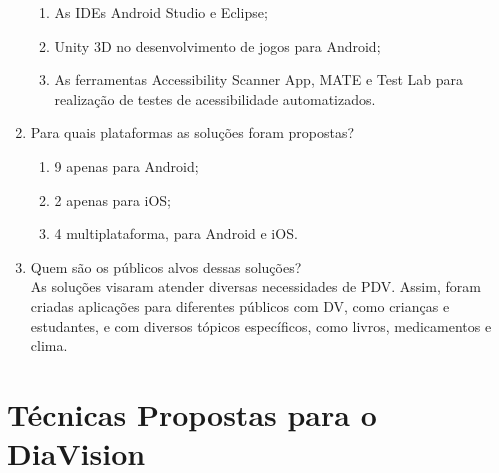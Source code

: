 \begin{enumerate}
\begin{enumerate}
                  \item As IDEs Android Studio e Eclipse;
                  \item Unity 3D no desenvolvimento de jogos para Android;
                  \item As ferramentas Accessibility Scanner App, MATE e Test Lab para realização de testes de acessibilidade automatizados.
            \end{enumerate}
      \item Para quais plataformas as soluções foram propostas?
            \begin{enumerate}
                  \item 9 apenas para Android;
                  \item 2 apenas para iOS\@;
                  \item 4 multiplataforma, para Android e iOS\@.
            \end{enumerate}
      \item Quem são os públicos alvos dessas soluções? \\
            As soluções visaram atender diversas necessidades de PDV\@.
            Assim, foram criadas aplicações para diferentes públicos com DV,
            como crianças e estudantes, e com diversos tópicos específicos,
            como livros, medicamentos e clima.
\end{enumerate}

\section{Técnicas Propostas para o DiaVision}

